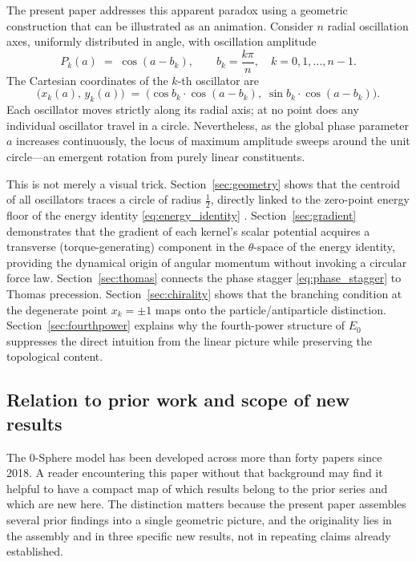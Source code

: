 \documentclass[%
 reprint, amsmath,amssymb, aps, prb, ]{revtex4-2}
\numberwithin{equation}{section}
\newcommand{\iphase}{\theta}
\begin{document}
The present paper addresses this apparent paradox using a geometric construction that can be illustrated as an animation.
Consider $n$ radial oscillation axes, uniformly distributed in angle, with oscillation amplitude
\begin{equation}
P_k(a) \;=\; \cos(a - b_k),
\qquad b_k = \frac{k\pi}{n},\quad k = 0, 1, \ldots, n-1.
\label{eq:phase_stagger}
\end{equation}
The Cartesian coordinates of the $k$-th oscillator are
\begin{equation}
\bigl(x_k(a),\, y_k(a)\bigr)
\;=\;
\bigl(\cos b_k \cdot \cos(a - b_k),\;\sin b_k \cdot \cos(a - b_k)\bigr).
\label{eq:star_coords}
\end{equation}
Each oscillator moves strictly along its radial axis; at no point does any individual oscillator travel in a circle.
Nevertheless, as the global phase parameter $a$ increases continuously, the locus of maximum amplitude sweeps around the unit circle---an emergent rotation from purely linear constituents.

This is not merely a visual trick.
Section~\ref{sec:geometry} shows that the centroid of all oscillators traces a circle of radius $\tfrac{1}{2}$, directly linked to the zero-point energy floor of the energy identity \eqref{eq:energy_identity} \cite{hanamura46}.
Section~\ref{sec:gradient} demonstrates that the gradient of each kernel's scalar potential acquires a transverse (torque-generating) component in the $\iphase$-space of the energy identity, providing the dynamical origin of angular momentum without invoking a circular force law.
Section~\ref{sec:thomas} connects the phase stagger \eqref{eq:phase_stagger} to Thomas precession.
Section~\ref{sec:chirality} shows that the branching condition at the degenerate point $x_k = \pm 1$ maps onto the particle/antiparticle distinction.
Section~\ref{sec:fourthpower} explains why the fourth-power structure of $E_0$ suppresses the direct intuition from the linear picture while preserving the topological content.

\subsection{Relation to prior work and scope of new results}
\label{subsec:prior_work}

The 0-Sphere model has been developed across more than forty papers since 2018.
A reader encountering this paper without that background may find it helpful to have a compact map of which results belong to the prior series and which are new here.
The distinction matters because the present paper assembles several prior findings into a single geometric picture, and the originality lies in the assembly and in three specific new results, not in repeating claims already established.
\end{document}
